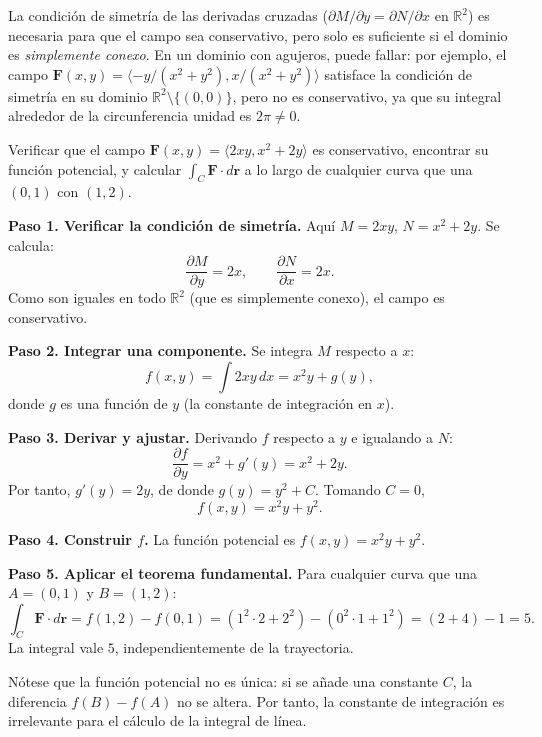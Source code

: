 \begin{rem}
La condición de simetría de las derivadas cruzadas ($\partial M/\partial
y = \partial N/\partial x$ en $\mathbb{R}^2$) es necesaria para que el
campo sea conservativo, pero solo es suficiente si el dominio es
\emph{simplemente conexo}. En un dominio con agujeros, puede fallar:
por ejemplo, el campo $\mathbf{F}(x,y) = \langle -y/(x^2+y^2),
x/(x^2+y^2) \rangle$ satisface la condición de simetría en su dominio
$\mathbb{R}^2\setminus\{(0,0)\}$, pero no es conservativo, ya que su
integral alrededor de la circunferencia unidad es $2\pi \neq 0$.
\end{rem}

\begin{example}
Verificar que el campo $\mathbf{F}(x,y) = \langle 2xy, x^2 + 2y \rangle$
es conservativo, encontrar su función potencial, y calcular
$\int_C \mathbf{F}\cdot d\mathbf{r}$ a lo largo de cualquier curva que
una $(0,1)$ con $(1,2)$.
\begin{myproof}
\textbf{Paso 1. Verificar la condición de simetría.}
Aquí $M=2xy$, $N=x^2+2y$. Se calcula:
\[
\frac{\partial M}{\partial y} = 2x, \qquad
\frac{\partial N}{\partial x} = 2x.
\]
Como son iguales en todo $\mathbb{R}^2$ (que es simplemente conexo),
el campo es conservativo.

\textbf{Paso 2. Integrar una componente.}
Se integra $M$ respecto a $x$:
\[
f(x,y) = \int 2xy \, dx = x^2 y + g(y),
\]
donde $g$ es una función de $y$ (la constante de integración en $x$).

\textbf{Paso 3. Derivar y ajustar.}
Derivando $f$ respecto a $y$ e igualando a $N$:
\[
\frac{\partial f}{\partial y} = x^2 + g'(y) = x^2 + 2y.
\]
Por tanto, $g'(y) = 2y$, de donde $g(y) = y^2 + C$. Tomando $C=0$,
\[
f(x,y) = x^2 y + y^2.
\]

\textbf{Paso 4. Construir $f$.}
La función potencial es $f(x,y)=x^2 y + y^2$.

\textbf{Paso 5. Aplicar el teorema fundamental.}
Para cualquier curva que una $A=(0,1)$ y $B=(1,2)$:
\[
\int_C \mathbf{F}\cdot d\mathbf{r}
= f(1,2) - f(0,1)
= (1^2\cdot 2 + 2^2) - (0^2\cdot 1 + 1^2)
= (2+4) - 1 = 5.
\]
La integral vale $\boxed{5}$, independientemente de la trayectoria.
\end{myproof}
\end{example}

\begin{rem}
Nótese que la función potencial no es única: si se añade una constante
$C$, la diferencia $f(B)-f(A)$ no se altera. Por tanto, la constante
de integración es irrelevante para el cálculo de la integral de línea.
\end{rem}

